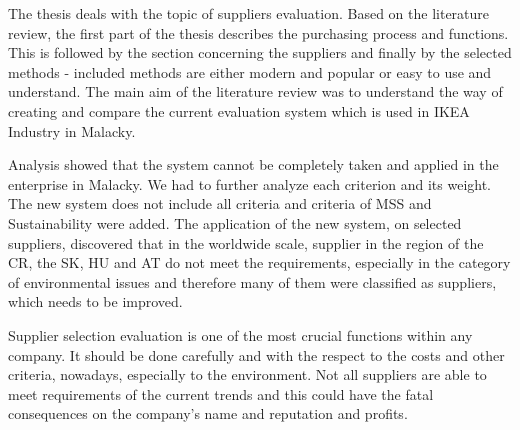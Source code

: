 \documentclass[oneside,12pt]{article}%
\begin{document}


The thesis deals with the topic of suppliers evaluation. Based on the literature review, the first part of the thesis describes the purchasing process and functions. This is followed by the section concerning the suppliers and finally by the selected methods - included methods are either modern and popular or easy to use and understand. The main aim of the literature review was to understand the way of creating and compare the current evaluation system which is used in IKEA Industry in Malacky. \par
Analysis showed that the system cannot be completely taken and applied in the enterprise in Malacky. We had to further analyze each criterion and its weight. The new system does not include all criteria and criteria of MSS and Sustainability were added. The application of the new system, on selected suppliers, discovered that in the worldwide scale, supplier in the region of the CR, the SK, HU and AT do not meet the requirements, especially in the category of environmental issues and therefore many of them were classified as suppliers, which needs to be improved. \par
Supplier selection evaluation is one of the most crucial functions within any company. It should be done carefully and with the respect to the costs and other criteria, nowadays, especially to the environment. Not all suppliers are able to meet requirements of the current trends and this could have the fatal consequences on the company's name and reputation and profits.
\end{document}
